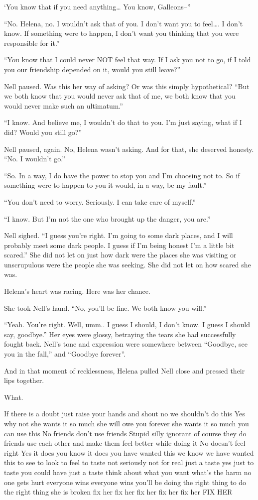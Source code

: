 ‘You know that if you need anything… You know, Galleons–”

“No. Helena, no. I wouldn’t ask that of you. I don’t want you to feel…. I don’t know. If something were to happen, I don’t want you thinking that you were responsible for it.”

“You know that I could never NOT feel that way. If I ask you not to go, if I told you our friendship depended on it, would you still leave?”

Nell paused. Was this her way of asking? Or was this simply hypothetical? “But we both know that you would never ask that of me, we both know that you would never make such an ultimatum.”

“I know. And believe me, I wouldn’t do that to you. I’m just saying, what if I did? Would you still go?”

Nell paused, again. No, Helena wasn’t asking. And for that, she deserved honesty. “No. I wouldn’t go.”

“So. In a way, I do have the power to stop you and I’m choosing not to. So if something were to happen to you it would, in a way, be my fault.”

“You don’t need to worry. Seriously. I can take care of myself.”

“I know. But I’m not the one who brought up the danger, you are.”

Nell sighed. “I guess you’re right. I’m going to some dark places, and I will probably meet some dark people. I guess if I’m being honest I’m a little bit scared.” She did not let on just how dark were the places she was visiting or unscrupulous were the people she was seeking. She did not let on how scared she was.

Helena’s heart was racing. Here was her chance.

She took Nell’s hand. “No, you’ll be fine. We both know you will.”

“Yeah. You’re right. Well, umm.. I guess I should, I don’t know. I guess I should say, goodbye.” Her eyes were glossy, betraying the tears she had successfully fought back. Nell’s tone and expression were somewhere between “Goodbye, see you in the fall,” and “Goodbye forever”.

And in that moment of recklessness, Helena pulled Nell close and pressed their lips together.

What.

If there is a doubt just raise your hands and shout no we shouldn’t do this Yes why not she wants it so much she will owe you forever she wants it so much you can use this No friends don’t use friends Stupid silly ignorant of course they do friends use each other and make them feel better while doing it No doesn’t feel right Yes it does you know it does you have wanted this we know we have wanted this to see to look to feel to taste not seriously not for real just a taste yes just to taste you could have just a taste think about what you want what’s the harm no one gets hurt everyone wins everyone wins you’ll be doing the right thing to do the right thing she is broken fix her fix her fix her fix her fix her FIX HER

